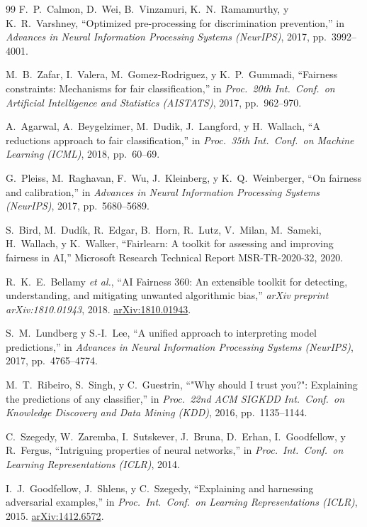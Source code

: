 \documentclass[11pt,a4paper]{article}
\begin{document}
\begin{thebibliography}{99}
F.~P.~Calmon, D.~Wei, B.~Vinzamuri, K.~N.~Ramamurthy, y K.~R.~Varshney,
``Optimized pre-processing for discrimination prevention,''
in \textit{Advances in Neural Information Processing Systems (NeurIPS)}, 2017, pp.~3992--4001.

M.~B.~Zafar, I.~Valera, M.~Gomez-Rodriguez, y K.~P.~Gummadi,
``Fairness constraints: Mechanisms for fair classification,''
in \textit{Proc.\ 20th Int.\ Conf.\ on Artificial Intelligence and Statistics (AISTATS)}, 2017, pp.~962--970.

A.~Agarwal, A.~Beygelzimer, M.~Dudik, J.~Langford, y H.~Wallach,
``A reductions approach to fair classification,''
in \textit{Proc.\ 35th Int.\ Conf.\ on Machine Learning (ICML)}, 2018, pp.~60--69.

G.~Pleiss, M.~Raghavan, F.~Wu, J.~Kleinberg, y K.~Q.~Weinberger,
``On fairness and calibration,''
in \textit{Advances in Neural Information Processing Systems (NeurIPS)}, 2017, pp.~5680--5689.

S.~Bird, M.~Dudík, R.~Edgar, B.~Horn, R.~Lutz, V.~Milan, M.~Sameki, H.~Wallach, y K.~Walker,
``Fairlearn: A toolkit for assessing and improving fairness in AI,''
Microsoft Research Technical Report MSR-TR-2020-32, 2020.

R.~K.~E.~Bellamy \textit{et al.},
``AI Fairness 360: An extensible toolkit for detecting, understanding, and mitigating unwanted algorithmic bias,''
\textit{arXiv preprint arXiv:1810.01943}, 2018.
\href{https://arxiv.org/abs/1810.01943}{arXiv:1810.01943}.

S.~M.~Lundberg y S.-I.~Lee,
``A unified approach to interpreting model predictions,''
in \textit{Advances in Neural Information Processing Systems (NeurIPS)}, 2017, pp.~4765--4774.

M.~T.~Ribeiro, S.~Singh, y C.~Guestrin,
``"Why should I trust you?": Explaining the predictions of any classifier,''
in \textit{Proc.\ 22nd ACM SIGKDD Int.\ Conf.\ on Knowledge Discovery and Data Mining (KDD)}, 2016, pp.~1135--1144.

C.~Szegedy, W.~Zaremba, I.~Sutskever, J.~Bruna, D.~Erhan, I.~Goodfellow, y R.~Fergus,
``Intriguing properties of neural networks,''
in \textit{Proc.\ Int.\ Conf.\ on Learning Representations (ICLR)}, 2014.

I.~J.~Goodfellow, J.~Shlens, y C.~Szegedy,
``Explaining and harnessing adversarial examples,''
in \textit{Proc.\ Int.\ Conf.\ on Learning Representations (ICLR)}, 2015.
\href{https://arxiv.org/abs/1412.6572}{arXiv:1412.6572}.


\end{thebibliography}
\end{document}
